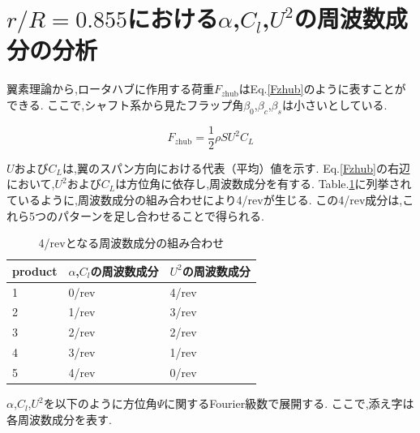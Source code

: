     \clearpage
    \section{$r/R= 0.855$における$\alpha$,$C_l$,$U^2$の周波数成分の分析}
    \label{sec:alpha_u2_fft}

    \par
    翼素理論から,ロータハブに作用する荷重$F_{z\mathrm{hub}}$はEq.\eqref{Fzhub}のように表すことができる.
    ここで,シャフト系から見たフラップ角$\beta_0$,$\beta_c$,$\beta_s$は小さいとしている.

    \begin{equation}
        F_{z\mathrm{hub}} = \frac{1}{2}\rho S U^2 C_L  \label{Fzhub}
    \end{equation}

    $U$および$C_L$は,翼のスパン方向における代表（平均）値を示す.
    Eq.\eqref{Fzhub}の右辺において,$U^2$および$C_L$は方位角に依存し,周波数成分を有する.
    Table.\ref{table:product_combination}に列挙されているように,周波数成分の組み合わせにより4/revが生じる.
    この4/rev成分は,これら5つのパターンを足し合わせることで得られる.

    \begin{table}[H]
        \centering
        \caption{4/revとなる周波数成分の組み合わせ}
        \label{table:product_combination}
        \setlength{\tabcolsep}{5pt}
        \begin{tabular}{|l|l|l|}
            \hline product  &    $\alpha$,$C_l$の周波数成分  &    $U^2$の周波数成分     \\
            \hline 1        &       0/rev                   &         4/rev           \\
            \hline 2        &       1/rev                   &         3/rev           \\
            \hline 3        &       2/rev                   &         2/rev           \\
            \hline 4        &       3/rev                   &         1/rev           \\
            \hline 5        &       4/rev                   &         0/rev           \\
            \hline 
        \end{tabular}
    \end{table}    
    
    
    $\alpha$,$C_l$,$U^2$を以下のように方位角$\Psi$に関するFourier級数で展開する.
    ここで,添え字は各周波数成分を表す.

